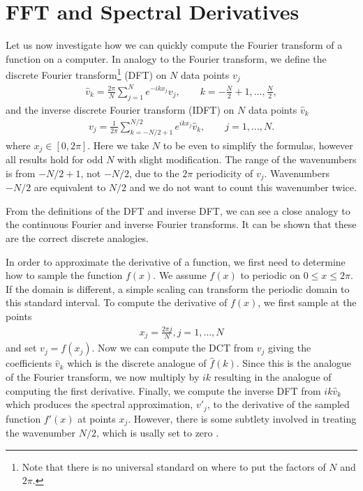 \section{FFT and Spectral Derivatives} 
Let us now investigate how we can quickly compute the Fourier transform of a function on a computer. In analogy to the Fourier transform, we define \cite{trefethen_spectral} the discrete Fourier transform\footnote{Note that there is no universal standard on where to put the factors of $N$ and $2\pi$.} (DFT) on $N$ data points $v_{j}$
\begin{align}
\hat{v}_{k} = \frac{2\pi}{N}\sum_{j=1}^{N} e^{-ikx_{j}}v_{j},\qquad k=-\frac{N}{2}+1,\ldots,\frac{N}{2},\label{dft}
\end{align}
and the inverse discrete Fourier transform (IDFT)  on $N$ data points $\hat{v}_{k}$
\begin{align}
v_{j} = \frac{1}{2\pi}\sum_{k=-N/2+1}^{N/2} e^{ikx_{j}}\hat{v}_{k}, \qquad j=1,\ldots, N.\label{idft}
\end{align}
where $x_{j}\in[0,2\pi]$. Here we take $N$ to be even to simplify the formulas, however all results hold for odd $N$ with slight modification. The range of the wavenumbers is from $-N/2+1$, not $-N/2$, due to the $2\pi$ periodicity of $v_{j}$. Wavenumbers $-N/2$ are equivalent to $N/2$ and we do not want to count this wavenumber twice. 


From the definitions of the DFT and inverse DFT, we can see a close analogy to the continuous Fourier and inverse Fourier transforms. It can be shown \cite{trefethen_spectral} that these are the correct discrete analogies. 

In order to approximate the derivative of a function, we first need to determine how to sample the function $f(x)$. We assume $f(x)$ to periodic on $0\le x\le 2\pi$. If the domain is different, a simple scaling can transform the periodic domain to this standard interval. To compute the derivative of $f(x)$, we first sample at the points 
\begin{align}
x_{j} = \frac{2\pi j}{N}, j=1,\ldots,N
\end{align}
and set $v_{j}=f(x_{j})$. Now we can compute the DCT from $v_{j}$ giving the coefficients $\hat{v}_{k}$ which is the discrete analogue of $\hat{f}(k)$.  Since this is the analogue of the Fourier transform, we now multiply by $ik$ resulting in the analogue of computing the first derivative. Finally, we compute the inverse DFT from $ik\hat{v}_{k}$ which produces the spectral approximation, $v'_{j}$, to the derivative of the sampled function $f'(x)$ at points $x_{j}$. However, there is some subtlety involved in treating the wavenumber $N/2$, which is usally set to zero \cite{trefethen_spectral}.

